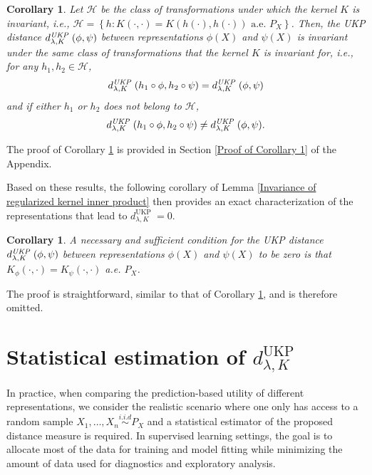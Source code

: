 \documentclass{article}
\theoremstyle{plain}
\newcounter{corollarynno}
\newtheorem{corollary}[corollarynno]{Corollary}
\newcommand{\repone}{\phi}
\newcommand{\reptwo}{\psi}
\newcommand{\metricstname}{UKP }
\begin{document}
\begin{corollary}
\label{corollary 1}
Let $\mathcal{H}$ be the class of transformations under which the kernel $K$ is invariant, i.e., $\mathcal{H} = \left\{h : K(\cdot,\cdot) = K(h(\cdot),h(\cdot))\textrm{ a.e. } P_{X}\right\}$. Then, the \emph{\metricstname} distance $d_{\lambda,K}^{\emph{\metricstname}}(\repone,\reptwo)$ between representations $\repone(X)$ and $\reptwo(X)$ is invariant under the same class of transformations that the kernel $K$ is invariant for, i.e., for any $h_{1},h_{2} \in \mathcal{H}$, 
\[
d_{\lambda,K}^{\emph{\metricstname}}(h_{1} \circ \repone,h_{2} \circ \reptwo) = d_{\lambda,K}^{\emph{\metricstname}}(\repone,\reptwo)
\]
and if either $h_{1}$ or $h_{2}$ does not belong to $\mathcal{H}$, \[
d_{\lambda,K}^{\emph{\metricstname}}(h_{1} \circ \repone,h_{2} \circ \reptwo) \neq d_{\lambda,K}^{\emph{\metricstname}}(\repone,\reptwo).
\]
\end{corollary}

The proof of Corollary \ref{corollary 1} is provided in Section  \ref{Proof of Corollary 1} of the Appendix. 

Based on these results, the following corollary of Lemma \ref{Invariance of regularized kernel inner product} then provides an exact characterization of the representations that lead to $d_{\lambda,K}^{\text{\metricstname}}=0$.

\begin{corollary}\label{corollary 2}
    A necessary and sufficient condition for the \emph{\metricstname} distance $d_{\lambda,K}^{\emph{\metricstname}}(\repone,\reptwo)$ between representations $\repone(X)$ and $\reptwo(X)$ to be zero is that $K_{\repone}(\cdot,\cdot) = K_{\reptwo}(\cdot,\cdot)$ a.e. $P_{X}$.
\end{corollary}

The proof is straightforward, similar to that of Corollary \ref{corollary 1}, and is therefore omitted.

\section{Statistical estimation of $d_{\lambda,K}^{\text{\metricstname}}$} \label{statistical estimation of UKP}

In practice, when comparing the prediction-based utility of different representations, we consider the realistic scenario where one only has access to a random sample $X_{1},\dots, X_{n} \overset{i.i.d}{\sim}P_{X}$ and a statistical estimator of the proposed distance measure is required. In supervised learning settings, the goal is to allocate most of the data for training and model fitting while minimizing the amount of data used for diagnostics and exploratory analysis.
\end{document}
